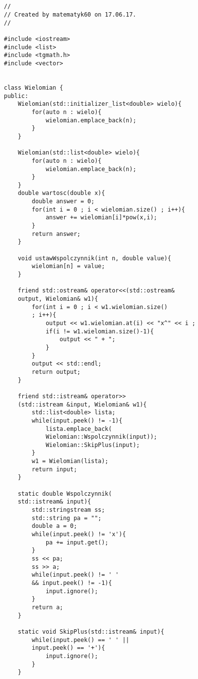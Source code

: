 \documentclass{article}
\begin{document}
\subsection{}
\begin{multicols}{2}
\begin{verbatim}
//
// Created by matematyk60 on 17.06.17.
//

#include <iostream>
#include <list>
#include <tgmath.h>
#include <vector>


class Wielomian {
public:
    Wielomian(std::initializer_list<double> wielo){
        for(auto n : wielo){
            wielomian.emplace_back(n);
        }
    }

    Wielomian(std::list<double> wielo){
        for(auto n : wielo){
            wielomian.emplace_back(n);
        }
    }
    double wartosc(double x){
        double answer = 0;
        for(int i = 0 ; i < wielomian.size() ; i++){
            answer += wielomian[i]*pow(x,i);
        }
        return answer;
    }

    void ustawWspolczynnik(int n, double value){
        wielomian[n] = value;
    }

    friend std::ostream& operator<<(std::ostream& 
    output, Wielomian& w1){
        for(int i = 0 ; i < w1.wielomian.size()
        ; i++){
            output << w1.wielomian.at(i) << "x^" << i ;
            if(i != w1.wielomian.size()-1){
                output << " + ";
            }
        }
        output << std::endl;
        return output;
    }

    friend std::istream& operator>>
    (std::istream &input, Wielomian& w1){
        std::list<double> lista;
        while(input.peek() != -1){
            lista.emplace_back(
            Wielomian::Wspolczynnik(input));
            Wielomian::SkipPlus(input);
        }
        w1 = Wielomian(lista);
        return input;
    }

    static double Wspolczynnik(
    std::istream& input){
        std::stringstream ss;
        std::string pa = "";
        double a = 0;
        while(input.peek() != 'x'){
            pa += input.get();
        }
        ss << pa;
        ss >> a;
        while(input.peek() != ' '
        && input.peek() != -1){
            input.ignore();
        }
        return a;
    }

    static void SkipPlus(std::istream& input){
        while(input.peek() == ' ' ||
        input.peek() == '+'){
            input.ignore();
        }
    }


\end{verbatim}
\end{multicols}
\end{document}
